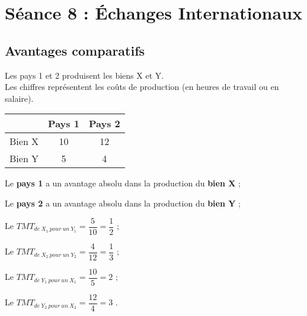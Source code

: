 \section{Séance 8 : Échanges Internationaux}




\subsection{Avantages comparatifs}



Les pays 1 et 2 produisent les biens X et Y.\\
Les chiffres représentent les coûts de production (en heures de travail ou en salaire).
\begin{center}
	\begin{tabular}{|c|c|c|}
		\hline
		       & Pays 1 & Pays 2\\\hline
		Bien X & 10     & 12    \\\hline
		Bien Y & 5      & 4    \\\hline
	\end{tabular}
\end{center}

\begin{description}
	\item Le \textbf{pays 1} a un avantage absolu dans la production du \textbf{bien X} ;
	\item Le \textbf{pays 2} a un avantage absolu dans la production du \textbf{bien Y} ;
	\item Le \textbf{$TMT_{de\ X_1\ pour\ un\ Y_1} = \dfrac{5}{10} = \dfrac{1}{2}$ } ;
	\item Le \textbf{$TMT_{de\ X_2\ pour\ un\ Y_2} = \dfrac{4}{12} = \dfrac{1}{3}$ } ;
	\item Le \textbf{$TMT_{de\ Y_1\ pour\ un\ X_1} = \dfrac{10}{5} = 2$ } ;
	\item Le \textbf{$TMT_{de\ Y_2\ pour\ un\ X_2} = \dfrac{12}{4} = 3$ }.
\end{description}